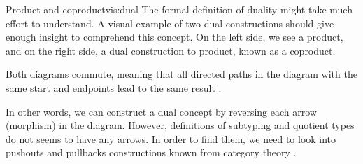 \begin{vis}[]{Product and coproduct}{vis:dual}
The formal definition of duality might take much effort to understand. A visual example of two dual constructions should give enough insight to comprehend this concept. On the left side, we see a product, and on the right side, a dual construction to product, known as a coproduct.
\begin{center}
\end{center}
Both diagrams commute, meaning that all directed paths in the diagram with the same start and endpoints lead to the same result \cite{CategoryTheory}.
\end{vis}
In other words, we can construct a dual concept by reversing each arrow (morphism) in the diagram. However, definitions of subtyping and quotient types
do not seems to have any arrows. In order to find them, we need to look into pushouts and pullbacks constructions known from category theory \cite{CategoryTheory}.
